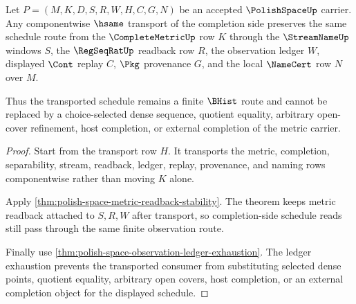 \begin{theorem}
\label{thm:polish-space-completion-schedule-stability}
Let $P=(M,K,D,S,R,W,H,C,G,N)$ be an accepted $\PolishSpaceUp$ carrier. Any componentwise $\hsame$ transport of the completion side preserves the same schedule route from the $\CompleteMetricUp$ row $K$ through the $\StreamNameUp$ windows $S$, the $\RegSeqRatUp$ readback row $R$, the observation ledger $W$, displayed $\Cont$ replay $C$, $\Pkg$ provenance $G$, and the local $\NameCert$ row $N$ over $M$.

Thus the transported schedule remains a finite $\BHist$ route and cannot be replaced by a choice-selected dense sequence, quotient equality, arbitrary open-cover refinement, host completion, or external completion of the metric carrier.
\end{theorem}
\begin{proof}
Start from the transport row $H$. It transports the metric, completion, separability, stream, readback, ledger, replay, provenance, and naming rows componentwise rather than moving $K$ alone.

Apply \autoref{thm:polish-space-metric-readback-stability}. The theorem keeps metric readback attached to $S,R,W$ after transport, so completion-side schedule reads still pass through the same finite observation route.

Finally use \autoref{thm:polish-space-observation-ledger-exhaustion}. The ledger exhaustion prevents the transported consumer from substituting selected dense points, quotient equality, arbitrary open covers, host completion, or an external completion object for the displayed schedule.
\end{proof}

